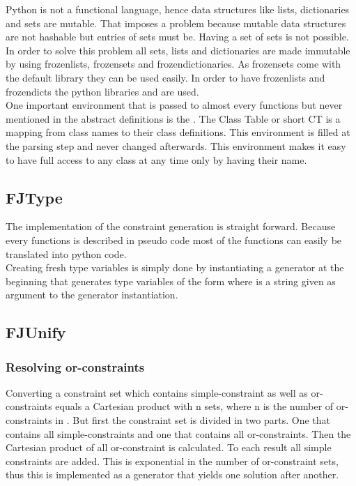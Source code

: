 Python is not a functional language, hence data structures like lists, dictionaries and sets are mutable. That imposes a problem because mutable data structures are not hashable but entries of sets must be. Having a set of sets is not possible.
In order to solve this problem all sets, lists and dictionaries are made immutable by using frozenlists, frozensets and frozendictionaries. As frozensets come with the default library they can be used easily. In order to have frozenlists and frozendicts the python libraries  and  are used.\\
One important environment that is passed to almost every functions but never mentioned in the abstract definitions is the . The Class Table or short CT is a mapping from class names to their class definitions. This environment is filled at the parsing step and never changed afterwards. This environment makes it easy to have full access to any class at any time only by having their name.\\



\subsection{FJType}
The implementation of the constraint generation is straight forward. Because every functions is described in pseudo code most of the functions can easily be translated into python code. \\
Creating fresh type variables is simply done by instantiating a generator at the beginning that generates type variables of the form  where  is a string given as argument to the generator instantiation. \\

\subsection{FJUnify}

\subsubsection{Resolving or-constraints}
Converting a constraint set  which contains simple-constraint as well as or-constraints equals a Cartesian product with n sets, where n is the number of or-constraints in .
But first the constraint set  is divided in two parts. One that contains all simple-constraints and one that contains all or-constraints.
Then the Cartesian product of all or-constraint is calculated. To each result all simple constraints are added. This is exponential in the number of or-constraint sets, thus this is implemented as a generator that yields one solution after another.

